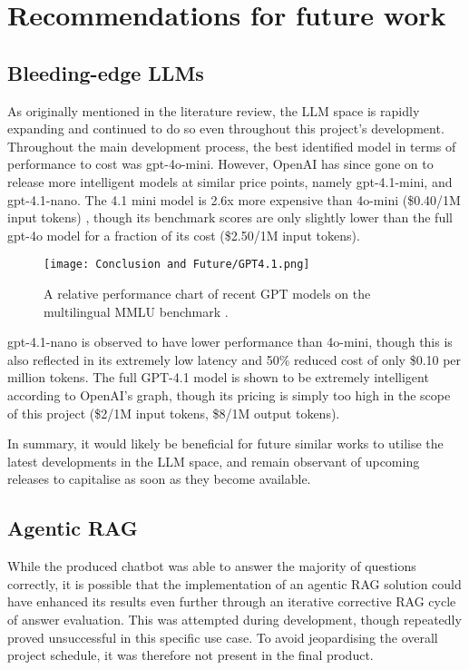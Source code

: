 \chapter{Recommendations for future work}

\section{Bleeding-edge LLMs}
As originally mentioned in the literature review, the LLM space is rapidly expanding and continued to do so even throughout this project's 
development. Throughout the main development process, the best identified model in terms of performance to cost was gpt-4o-mini. However,
OpenAI has since gone on to release more intelligent models at similar price points, namely gpt-4.1-mini, and gpt-4.1-nano. The 4.1 mini model 
is 2.6x more expensive than 4o-mini (\$0.40/1M input tokens) \autocite{openaiPricingOpenAIAPI}, 
though its benchmark scores are only slightly lower than the full gpt-4o model for a fraction of its cost (\$2.50/1M input tokens). 

\begin{figure}[H]
    \centering
    \texttt{[image: Conclusion and Future/GPT4.1.png]}
    \caption{A relative performance chart of recent GPT models on the multilingual MMLU benchmark \autocite{openaiIntroducingGPT41API}.\label{fig:GPT41Perf}}
\end{figure}

\noindent gpt-4.1-nano is observed to have lower performance than 4o-mini, though this is also reflected in its extremely low latency and 
50\% reduced cost of only \$0.10 per million tokens. The full GPT-4.1 model is shown to be extremely intelligent according to OpenAI's graph,
though its pricing is simply too high in the scope of this project (\$2/1M input tokens, \$8/1M output tokens).

\para In summary, it would likely be beneficial for future similar works to utilise the latest developments in the LLM space, and remain observant 
of upcoming releases to capitalise as soon as they become available.

\section{Agentic RAG}
While the produced chatbot was able to answer the majority of questions correctly, it is possible that the implementation of an agentic RAG 
solution could have enhanced its results even further through an iterative corrective RAG cycle of answer evaluation. 
This was attempted during development, though repeatedly proved unsuccessful in this specific use case. 
To avoid jeopardising the overall project schedule, it was therefore not present in the final product. 

